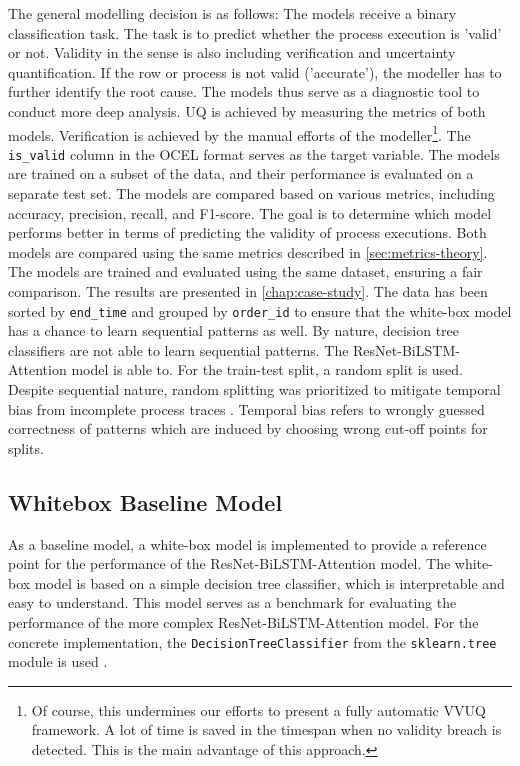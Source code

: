 The general modelling decision is as follows: The models receive a binary classification task. The task is to predict whether the process execution is 'valid' or not. Validity in the sense is also including verification and uncertainty quantification. If the row or process is not valid ('accurate'), the modeller has to further identify the root cause. The models thus serve as a diagnostic tool to conduct more deep analysis. UQ is achieved by measuring the metrics of both models. Verification is achieved by the manual efforts of the modeller\footnote{Of course, this undermines our efforts to present a fully automatic VVUQ framework. A lot of time is saved in the timespan when no validity breach is detected. This is the main advantage of this approach.}. The \texttt{is\_valid} column in the OCEL format serves as the target variable. The models are trained on a subset of the data, and their performance is evaluated on a separate test set. The models are compared based on various metrics, including accuracy, precision, recall, and F1-score. The goal is to determine which model performs better in terms of predicting the validity of process executions. Both models are compared using the same metrics described in \autoref{sec:metrics-theory}. The models are trained and evaluated using the same dataset, ensuring a fair comparison. The results are presented in \autoref{chap:case-study}. The data has been sorted by \texttt{end\_time} and grouped by \texttt{order\_id} to ensure that the white-box model has a chance to learn sequential patterns as well. By nature, decision tree classifiers are not able to learn sequential patterns. The ResNet-BiLSTM-Attention model is able to. For the train-test split, a random split is used. Despite sequential nature, random splitting was prioritized to mitigate temporal bias from incomplete process traces \autocite{morita2022investigation}. Temporal bias refers to wrongly guessed correctness of patterns which are induced by choosing wrong cut-off points for splits.


\subsection{Whitebox Baseline Model}
As a baseline model, a white-box model is implemented to provide a reference point for the performance of the ResNet-BiLSTM-Attention model. The white-box model is based on a simple decision tree classifier, which is interpretable and easy to understand. This model serves as a benchmark for evaluating the performance of the more complex ResNet-BiLSTM-Attention model. For the concrete implementation, the \texttt{DecisionTreeClassifier} from the \texttt{sklearn.tree} module is used \autocite{Scikit-Learn}.

